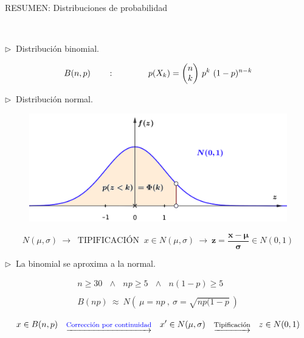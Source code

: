 \begin{myblock}{RESUMEN: Distribuciones de probabilidad}

$\quad$

\vspace{5mm} $\triangleright \ $ Distribución binomial.
	
	$$B(n,p) 
	\qquad : \qquad \qquad
	p(X_k)=\mqty(n\\k) \ p^k\ (1-p)^{n-k}$$
	
	\vspace{5mm} $\triangleright \ $ Distribución normal.
	
	\begin{figure}[H]
	\centering
	\includegraphics[width=.75\textwidth]{imagenes/imagenes04/T04IM43.png}
	\end{figure}
	
	$$N(\mu,\sigma) \ \to \ \text{ TIPIFICACIÓN } \ x\in N(\mu,\sigma) \ \to \ \boldsymbol{ z=\dfrac{x-\mu}{\sigma} } \in N(0,1)$$

\vspace{5mm} $\triangleright \ $ La binomial se aproxima a la normal.
	
	$$\begin{matrix}
n\ge 30\ \ \ 	\wedge \ \ \ np\ge 5 \ \ \ \wedge \ \ \ n(1-p)\ge 5 
\\ \\
B (np) \ \approx \ N \left( \ \mu=np \ , \ \sigma=\sqrt{np(1-p} \ \right)
\end{matrix}$$



$$x\in B(n,p) 
\quad
\underrightarrow{\text{\footnotesize{\textcolor{blue}{Corrección por continuidad}}}}
\quad 
x'\in N(\mu,\sigma) 
\quad
\underrightarrow{\text{\footnotesize{Tipificación}}}
\quad
z\in N(0,1)
$$

$\quad$

\end{myblock}









